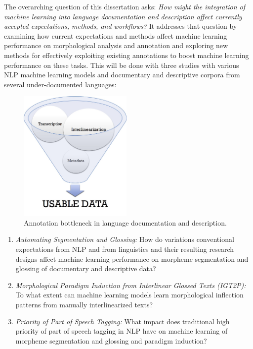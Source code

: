 
The overarching question of this dissertation asks: \emph{How might the integration of machine learning into language documentation and description affect currently accepted expectations, methods, and workflows?} It addresses that question by examining how current expectations and methods affect machine learning performance on morphological analysis and annotation and exploring new methods for effectively exploiting existing annotations to boost machine learning performance on these tasks. This will be done with three studies with various NLP machine learning models and documentary and descriptive corpora from several under-documented languages:

\begin{figure}[t]
    \centering
    \includegraphics[width=5.5cm]{figs/AnnotationFunnel.jpg}
    \caption[Annotation Bottleneck]{Annotation bottleneck in language documentation and description.}
    \label{fig:bottleneck}
\end{figure}


\begin{enumerate}
\item{} \emph{Automating Segmentation and Glossing:} How do variations conventional expectations from NLP and from linguistics and their resulting research designs affect machine learning performance on morpheme segmentation and glossing of documentary and descriptive data? 

\item{} \emph{Morphological Paradigm Induction from Interlinear Glossed Texts (IGT2P):} To what extent can machine learning models learn morphological inflection patterns from manually interlinearized texts?

\item \emph{Priority of Part of Speech Tagging:} 
What impact does traditional high priority of part of speech tagging in NLP have on machine learning of morpheme segmentation and glossing and paradigm induction?
\end{enumerate}


